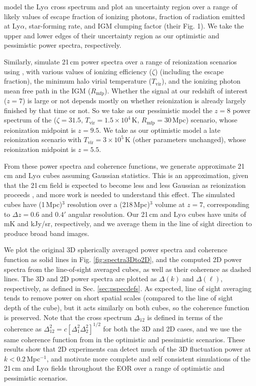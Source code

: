 \documentclass[numberedappendix]{emulateapj}
\begin{document}
\citet{Gong2014} model the Ly$\alpha$ cross spectrum and plot an uncertainty region over a range of likely values of escape fraction of ionizing photons, fraction of radiation emitted at Ly$\alpha$, star-forming rate, and IGM clumping factor (their Fig. 1). We take the upper and lower edges of their uncertainty region as our optimistic and pessimistic power spectra, respectively. 

Similarly, \citet{PoberNextGen} simulate 21\,cm power spectra over a range of reionization scenarios using \citet{21cmfast}, with various values of ionizing efficiency ($\zeta$) (including the escape fraction), the minimum halo virial temperature ($T_\text{vir}$), and the ionizing photon mean free path in the IGM ($R_\text{mfp}$). Whether the signal at our redshift of interest ($z=7$) is large or not depends mostly on whether reionization is already largely finished by that time or not. So we take as our pessimistic model the $z=8$ power spectrum of the ($\zeta =31.5$, $T_\text{vir}=1.5\times10^4$\,K, $R_\text{mfp}=30$\,Mpc) scenario, whose reionization midpoint is $z=9.5$. We take as our optimistic model a late reionization scenario with $T_\text{vir}=3\times10^5$\,K (other parameters unchanged), whose reionization midpoint is $z=5.5$. 

From these power spectra and coherence functions, we generate approximate 21\,cm and Ly$\alpha$ cubes assuming Gaussian statistics. This is an approximation, given that the 21\,cm field is expected to become less and less Gaussian as reionization proceeds \citep{skew}, and more work is needed to understand this effect. The simulated cubes have (1\,Mpc)$^3$ resolution over a (218\,Mpc)$^3$ volume at $z=7$, corresponding to $\Delta z=0.6$ and $0.4'$ angular resolution. Our 21\,cm and Ly$\alpha$ cubes have units of mK and kJy/sr, respectively, and we average them in the line of sight direction to produce broad band images.

We plot the original 3D spherically averaged power spectra and coherence function as solid lines in Fig. \ref{fig:spectra3Dto2D}, and the computed 2D power spectra from the line-of-sight averaged cubes, as well as their coherence as dashed lines. The 3D and 2D power spectra are plotted as $\Delta(k)$ and $\Delta(\ell)$, respectively, as defined in Sec. \ref{sec:pspecdefs}. As expected, line of sight averaging tends to remove power on short spatial scales (compared to the line of sight depth of the cube), but it acts similarly on both cubes, so the coherence function is preserved. Note that the cross spectrum $\Delta_{12}$ is defined in terms of the coherence as $\Delta^2_{12}=c[\Delta^2_1\Delta_2^2]^{1/2}$ for both the 3D and 2D cases, and we use the same coherence function from \citet{Heneka2016} in the optimistic and pessimistic scenarios. These results show that 2D experiments can detect much of the 3D fluctuation power at $k<0.2$\,Mpc$^{-1}$, and motivate more complete and self consistent simulations of the 21\,cm and Ly$\alpha$ fields throughout the EOR over a range of optimistic and pessimistic scenarios.
\end{document}
